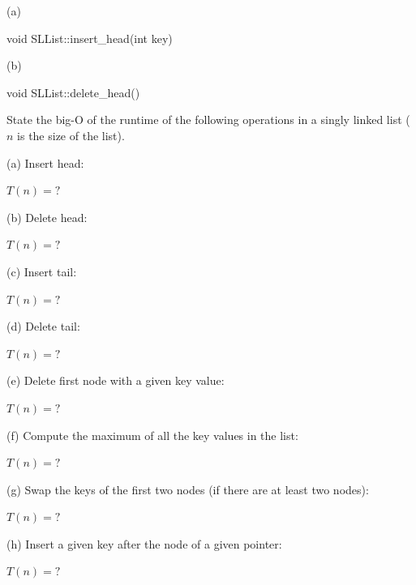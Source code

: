 (a)
\ANSWER
\begin{answercode}
void SLList::insert_head(int key)
{

}
\end{answercode}

(b)
\ANSWER
\begin{answercode}
void SLList::delete_head()
{

}
\end{answercode}

\newpage
\nextq %
State the big-O of the runtime of the following operations
in a singly linked list ($n$ is the size of the list).

(a)
Insert head:
\\
\ANSWER
\begin{answerlong}
$T(n) = ?$
\end{answerlong}


(b)
Delete head:
\\
\ANSWER
\begin{answerlong}
$T(n) = ?$
\end{answerlong}
    
(c)
Insert tail:
\\
\ANSWER
\begin{answerlong}
$T(n) = ?$
\end{answerlong}

(d)
Delete tail:
\\
\ANSWER
\begin{answerlong}
$T(n) = ?$
\end{answerlong}

(e)
Delete first node with a given key value:
\\
\ANSWER
\begin{answerlong}
$T(n) = ?$
\end{answerlong}
  
(f)
Compute the maximum of all the key values in the list:
\\
\ANSWER
\begin{answerlong}
$T(n) = ?$
\end{answerlong}
  
(g)
Swap the keys of the first two nodes (if there are at least two nodes):
\\
\ANSWER
\begin{answerlong}
$T(n) = ?$
\end{answerlong}

(h)
Insert a given key after the node of a given pointer:
\\
\ANSWER
\begin{answerlong}
$T(n) = ?$
\end{answerlong}

